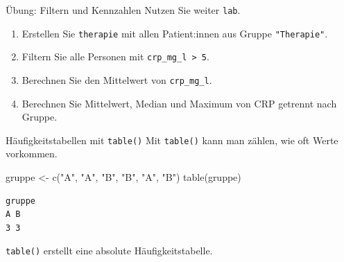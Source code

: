 \documentclass[
  10pt,
  ignorenonframetext,
  aspectratio=169,
]{beamer}
\newenvironment{Shaded}{}{}
\newcommand{\FunctionTok}[1]{\textcolor[rgb]{0.02,0.16,0.49}{#1}}
\newcommand{\NormalTok}[1]{#1}
\newcommand{\OtherTok}[1]{\textcolor[rgb]{0.00,0.44,0.13}{#1}}
\newcommand{\StringTok}[1]{\textcolor[rgb]{0.25,0.44,0.63}{#1}}
\providecommand{\tightlist}{%
  \setlength{\itemsep}{0pt}\setlength{\parskip}{0pt}}
\begin{document}
\begin{frame}[fragile]{Übung: Filtern und Kennzahlen}
\label{uxfcbung-filtern-und-kennzahlen}
Nutzen Sie weiter \texttt{lab}.

\begin{enumerate}
\tightlist
\item
  Erstellen Sie \texttt{therapie} mit allen Patient:innen aus Gruppe
  \texttt{"Therapie"}.
\item
  Filtern Sie alle Personen mit \texttt{crp\_mg\_l\ \textgreater{}\ 5}.
\item
  Berechnen Sie den Mittelwert von \texttt{crp\_mg\_l}.
\item
  Berechnen Sie Mittelwert, Median und Maximum von CRP getrennt nach
  Gruppe.
\end{enumerate}
\end{frame}

\begin{frame}[fragile]{Häufigkeitstabellen mit \texttt{table()}}
\label{huxe4ufigkeitstabellen-mit-table}
Mit \texttt{table()} kann man zählen, wie oft Werte vorkommen.

\begin{Shaded}
\begin{Highlighting}[]
\NormalTok{gruppe }\OtherTok{\textless{}{-}} \FunctionTok{c}\NormalTok{(}\StringTok{"A"}\NormalTok{, }\StringTok{"A"}\NormalTok{, }\StringTok{"B"}\NormalTok{, }\StringTok{"B"}\NormalTok{, }\StringTok{"A"}\NormalTok{, }\StringTok{"B"}\NormalTok{)}
\FunctionTok{table}\NormalTok{(gruppe)}
\end{Highlighting}
\end{Shaded}

\begin{verbatim}
gruppe
A B 
3 3 
\end{verbatim}

\texttt{table()} erstellt eine absolute Häufigkeitstabelle.
\end{frame}
\end{document}
